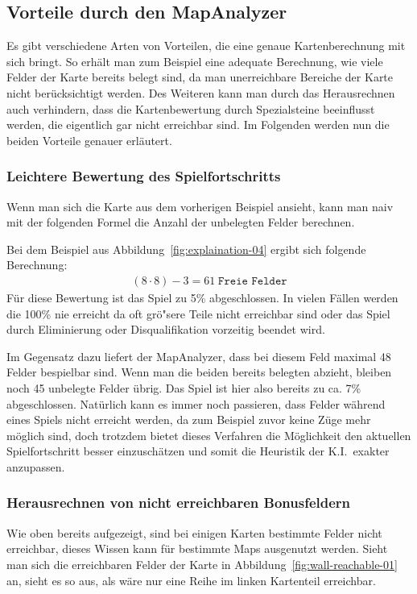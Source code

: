 \subsection{Vorteile durch den MapAnalyzer}\label{subsec:vorteile-mapanalyzer}
Es gibt verschiedene Arten von Vorteilen, die eine genaue Kartenberechnung mit sich bringt.
So erh\"alt man zum Beispiel eine adequate Berechnung, wie viele Felder der Karte bereits belegt sind, da man unerreichbare Bereiche der Karte nicht ber\"ucksichtigt werden.
Des Weiteren kann man durch das Herausrechnen auch verhindern, dass die Kartenbewertung durch Spezialsteine beeinflusst werden, die eigentlich gar nicht erreichbar sind.
Im Folgenden werden nun die beiden Vorteile genauer erl\"autert.

\subsubsection{Leichtere Bewertung des Spielfortschritts}\label{subsubsec:bewertung-fortschritt}
Wenn man sich die Karte aus dem vorherigen Beispiel ansieht, kann man naiv mit der folgenden Formel die Anzahl der unbelegten Felder berechnen.

Bei dem Beispiel aus Abbildung~\ref{fig:explaination-04} ergibt sich folgende Berechnung:
\begin{align}
    (8 \cdot 8) - 3 = 61\; \texttt{Freie Felder}
\end{align}
F\"ur diese Bewertung ist das Spiel zu 5\% abgeschlossen.
In vielen F\"allen werden die 100\% nie erreicht da oft gr\"o"sere Teile nicht erreichbar sind oder das Spiel durch Eliminierung oder Disqualifikation vorzeitig beendet wird.

Im Gegensatz dazu liefert der MapAnalyzer, dass bei diesem Feld maximal 48 Felder bespielbar sind.
Wenn man die beiden bereits belegten abzieht, bleiben noch 45 unbelegte Felder \"ubrig.
Das Spiel ist hier also bereits zu ca. 7\% abgeschlossen.
Nat\"urlich kann es immer noch passieren, dass Felder w\"ahrend eines Spiels nicht erreicht werden, da zum Beispiel zuvor keine Z\"uge mehr m\"oglich sind, doch trotzdem bietet dieses Verfahren die M\"oglichkeit den aktuellen Spielfortschritt besser einzusch\"atzen und somit die Heuristik der K.I.\ exakter anzupassen.

\subsubsection{Herausrechnen von nicht erreichbaren Bonusfeldern}\label{subsubsec:entfernung-bonusfelder}
Wie oben bereits aufgezeigt, sind bei einigen Karten bestimmte Felder nicht erreichbar, dieses Wissen kann f\"ur bestimmte Maps ausgenutzt werden.
Sieht man sich die erreichbaren Felder der Karte in Abbildung~\ref{fig:wall-reachable-01} an, sieht es so aus, als w\"are nur eine Reihe im linken Kartenteil erreichbar.

